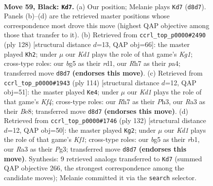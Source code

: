 \documentclass[11pt]{article}
\begin{document}
\clearpage

\begin{figure}[p]\centering
\begin{subfigure}{0.46\textwidth}\centering
\resizebox{\linewidth}{!}{%
\newchessgame
\chessboard[
  setfen={3k4/7r/3P4/1p4B1/4K3/r7/1p6/8 b - - 1 59},
  showmover=false,
  pgfstyle=straightmove, color=movearrow, markmove={d8-d7}
]}
\caption{}
\end{subfigure}\hfill
\begin{subfigure}{0.46\textwidth}\centering
\resizebox{\linewidth}{!}{%
\newchessgame
\chessboard[
  setfen={8/8/5k2/7R/p7/5P2/P7/3r2K1 w - - 1 65},
  showmover=false,
  pgfstyle=straightmove, color=movearrow, markmove={g1-h2}
]}
\caption{}
\end{subfigure}
\\[4pt]
\begin{subfigure}{0.46\textwidth}\centering
\resizebox{\linewidth}{!}{%
\newchessgame
\chessboard[
  setfen={1b2B3/8/P6k/8/5K1p/7P/8/8 w - - 1 58},
  showmover=false,
  pgfstyle=straightmove, color=movearrow, markmove={f4-e4}
]}
\caption{}
\end{subfigure}\hfill
\begin{subfigure}{0.46\textwidth}\centering
\resizebox{\linewidth}{!}{%
\newchessgame
\chessboard[
  setfen={8/8/6p1/R7/4k1p1/6P1/8/1r3K2 w - - 4 67},
  showmover=false,
  pgfstyle=straightmove, color=movearrow, markmove={f1-g2}
]}
\caption{}
\end{subfigure}
\caption{\textbf{Move 59, Black: \texttt{Kd7}.} (a) Our position; Melanie plays \texttt{Kd7} (\texttt{d8d7}). Panels (b)--(d) are the retrieved master positions whose correspondence most drove this move (highest QAP objective among those that transfer to it). (b) Retrieved from \texttt{ccrl\_top\_p0000\#2490} (ply 128) [structural distance $d$=13, QAP obj=66]: the master played \texttt{Kh2}; under $\mu$ our \emph{Kd1} plays the role of that game's \emph{Kg1}; cross-type roles: our \emph{b}g5 as their \emph{r}d1, our \emph{R}h7 as their \emph{p}a4; transferred move \texttt{d8d7} \textbf{(endorses this move)}. (c) Retrieved from \texttt{ccrl\_top\_p0000\#1943} (ply 114) [structural distance $d$=12, QAP obj=51]: the master played \texttt{Ke4}; under $\mu$ our \emph{Kd1} plays the role of that game's \emph{Kf4}; cross-type roles: our \emph{R}h7 as their \emph{P}h3, our \emph{R}a3 as their \emph{B}e8; transferred move \texttt{d8d7} \textbf{(endorses this move)}. (d) Retrieved from \texttt{ccrl\_top\_p0000\#1746} (ply 132) [structural distance $d$=12, QAP obj=50]: the master played \texttt{Kg2}; under $\mu$ our \emph{Kd1} plays the role of that game's \emph{Kf1}; cross-type roles: our \emph{b}g5 as their \emph{r}b1, our \emph{R}a3 as their \emph{P}g3; transferred move \texttt{d8d7} \textbf{(endorses this move)}. Synthesis: 9 retrieved analogs transferred to \texttt{Kd7} (summed QAP objective 266, the strongest correspondence among the candidate moves); Melanie committed it via the \texttt{search} selector.}
\label{fig:thought-m117}
\end{figure}
\end{document}

